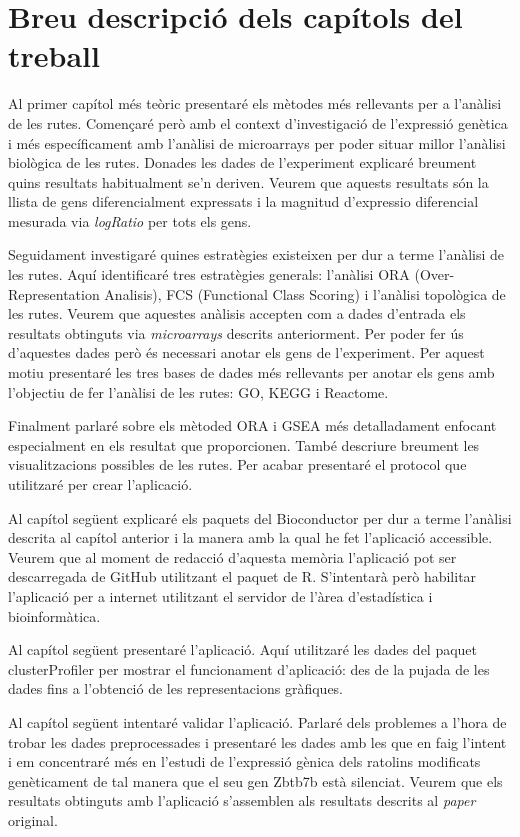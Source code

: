 \section{Breu descripció dels capítols del treball}

Al primer capítol més teòric presentaré els mètodes més rellevants per a l’anàlisi de les rutes. Començaré però amb el context d'investigació de l'expressió genètica i més específicament amb l'anàlisi de microarrays per poder situar millor l'anàlisi biològica de les rutes. Donades les dades de l'experiment explicaré breument quins resultats habitualment se’n deriven. Veurem que aquests resultats són la llista de gens diferencialment expressats i la magnitud d'expressio diferencial mesurada via \textit{\gls{logRatio}} per tots els gens. 

Seguidament investigaré quines estratègies existeixen per dur a terme l'anàlisi de les rutes. Aquí identificaré tres estratègies generals: l'anàlisi \gls{ORA} (Over-Representation Analisis), \gls{FCS} (Functional Class Scoring) i l'anàlisi topològica de les rutes. Veurem que aquestes anàlisis accepten com a dades d'entrada els resultats obtinguts via \textit{microarrays} descrits anteriorment. Per poder fer ús d'aquestes dades però és necessari anotar els gens de l'experiment. Per aquest motiu presentaré les tres bases de dades més rellevants per anotar els gens amb l’objectiu de fer l’anàlisi de les rutes: \gls{GO}, \gls{KEGG} i Reactome.

Finalment parlaré sobre els mètoded \gls{ORA} i \gls{GSEA} més detalladament enfocant especialment en els resultat que proporcionen. També descriure breument les visualitzacions possibles de les rutes. Per acabar presentaré el protocol que utilitzaré per crear l'aplicació.

Al capítol següent explicaré els paquets del \gls{Bioconductor} per dur a terme l'anàlisi descrita al capítol anterior i la manera amb la qual he fet l'aplicació accessible. Veurem que al moment de redacció d'aquesta memòria l'aplicació pot ser descarregada de GitHub utilitzant el paquet  de R. S'intentarà però habilitar l'aplicació per a internet utilitzant el servidor de l'àrea d'estadística i bioinformàtica. 

Al capítol següent presentaré l'aplicació. Aquí utilitzaré les dades del paquet clusterProfiler per mostrar el funcionament d'aplicació: des de la pujada de les dades fins a l’obtenció de les representacions gràfiques.

Al capítol següent intentaré validar l'aplicació. Parlaré dels problemes a l'hora de trobar les dades preprocessades i presentaré les dades amb les que en faig l’intent i em concentraré més en l'estudi de l'expressió gènica dels ratolins modificats genèticament de tal manera que el seu gen Zbtb7b està silenciat. Veurem que els resultats obtinguts amb l'aplicació s'assemblen als resultats descrits al \textit{paper} original. 

